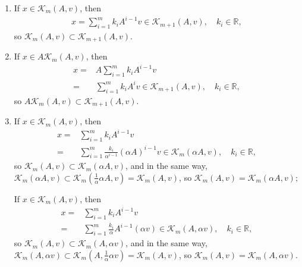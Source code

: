 \documentclass{article}
\begin{document}
\begin{enumerate}[(1)]
    \item If $x\in \mathcal{K}_m(A,v)$, then
          \begin{equation*}
              \begin{aligned}
                  x=\sum_{i=1}^m k_i A^{i-1}v\in \mathcal{K}_{m+1}(A,v),\quad k_i\in\mathbb{R},
              \end{aligned}
          \end{equation*}
          so $\mathcal{K}_m(A,v)\subset \mathcal{K}_{m+1}(A,v) .$
    \item If $x\in A\mathcal{K}_m(A,v)$, then
          \begin{equation*}
              \begin{aligned}
                  x= & A\sum_{i=1}^m k_i A^{i-1}v                                                \\
                  =  & \sum_{i=1}^m k_i A^{i}v\in \mathcal{K}_{m+1}(A,v),\quad k_i\in\mathbb{R},
              \end{aligned}
          \end{equation*}
          so $A\mathcal{K}_m(A,v)\subset \mathcal{K}_{m+1}(A,v)  .$

    \item If $x\in \mathcal{K}_m(A,v)$, then
          \begin{equation*}
              \begin{aligned}
                  x= & \sum_{i=1}^m k_i A^{i-1}v                                                                                    \\
                  =  & \sum_{i=1}^m \frac{k_i}{\alpha^{i-1}} (\alpha A)^{i-1}v \in\mathcal{K}_m(\alpha A,v),\quad k_i\in\mathbb{R},
              \end{aligned}
          \end{equation*}
          so $\mathcal{K}_m(A,v)\subset\mathcal{K}_m(\alpha A,v) $, and in the same way,$\mathcal{K}_m(\alpha A,v)\subset\mathcal{K}_m(\frac{1}{\alpha}\alpha A,v)= \mathcal{K}_m(A,v)$, so $\mathcal{K}_m(A,v)=\mathcal{K}_m(\alpha A,v);$



          If $x\in \mathcal{K}_m(A,v)$, then
          \begin{equation*}
              \begin{aligned}
                  x= & \sum_{i=1}^m k_i A^{i-1}v                                                                                \\
                  =  & \sum_{i=1}^m \frac{k_i}{\alpha}  A^{i-1}(\alpha v) \in\mathcal{K}_m( A,\alpha v),\quad k_i\in\mathbb{R},
              \end{aligned}
          \end{equation*}
          so $\mathcal{K}_m(A,v)\subset\mathcal{K}_m( A,\alpha v) $, and in the same way,$\mathcal{K}_m( A,\alpha v)\subset\mathcal{K}_m(A,\frac{1}{ \alpha}\alpha v)= \mathcal{K}_m(A,v)$, so $\mathcal{K}_m(A,v)=\mathcal{K}_m(A,\alpha v).$


\end{enumerate}
\end{document}
